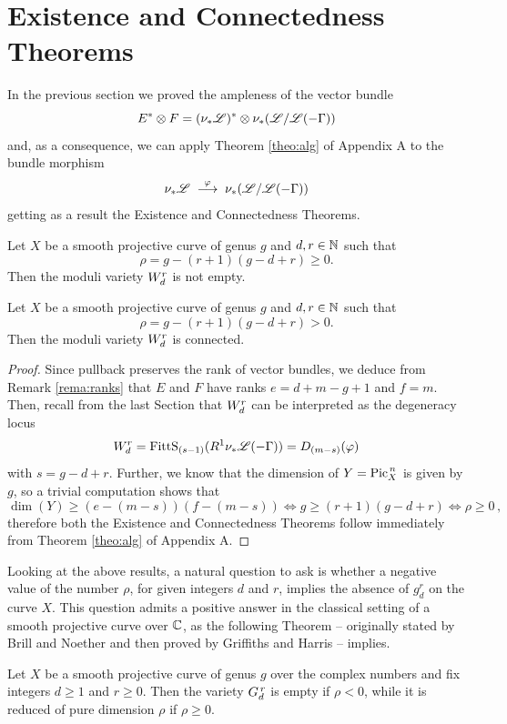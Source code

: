 \section{Existence and Connectedness Theorems}
	In the previous section we proved the ampleness of the vector bundle 
	$$ E^*\otimes F = (\nu_{*} \mathscr{L})^* \otimes \nu_{*} (\mathscr{L}/\mathscr{L}(-\Gamma)) $$
	and, as a consequence, we can apply Theorem \ref{theo:alg} of Appendix A to the bundle morphism
	$$ \nu_{*} \mathscr{L} \;\overset{\varphi}\longrightarrow\; \nu_{*} (\mathscr{L} / \mathscr{L}(-\Gamma)) $$
	getting as a result the Existence and Connectedness Theorems.
	\begin{namedtheo}\label{thm:existence}
		Let $X$ be a smooth projective curve of genus $g$ and $d,r\in \mathbb{N}$ such that
		$$ \rho = g-(r+1)(g-d+r) \geq 0. $$
		Then the moduli variety $W_d^r$ is not empty.
	\end{namedtheo}
	\begin{namedtheo}
		Let $X$ be a smooth projective curve of genus $g$ and $d,r\in \mathbb{N}$ such that
		$$ \rho = g-(r+1)(g-d+r) > 0. $$
		Then the moduli variety $W_d^r$ is connected.	
	\end{namedtheo}
	\begin{proof}
		Since pullback preserves the rank of vector bundles, we deduce from Remark \ref{rema:ranks} that $E$ and $F$ have ranks $e=d+m-g+1$ and $f=m$.
		Then, recall from the last Section that $W_d^r$ can be interpreted as the degeneracy locus
		$$ W_d^r = \operatorname{FittS}_{(s-1)}(R^1\nu_{*}\mathscr{L}(-\Gamma)) = D_{(m-s)}(\varphi) $$
		with $s=g-d+r$. Further, we know that the dimension of $Y=\operatorname{Pic}^{\,n}_X$ is given by $g$, so a trivial computation shows that
		$$ \dim(Y) \geq (e-(m-s))(f-(m-s)) \iff g \geq (r+1)(g-d+r) \iff \rho \geq 0\,, $$
		therefore both the Existence and Connectedness Theorems follow immediately from Theorem \ref{theo:alg} of Appendix A.
	\end{proof}
	Looking at the above results, a natural question to ask is whether a negative value of the \BN number $\rho$, for given integers $d$ and $r$, implies the absence of $g_d^r$ on the curve $X$. This question admits a positive answer in the classical setting of a smooth projective curve over $\mathbb{C}$, as the following Theorem -- originally stated by Brill and Noether and then proved by Griffiths and Harris -- implies.
	\begin{namedtheo}
		Let $X$ be a smooth projective curve of genus $g$ over the complex numbers and fix integers $d\geq 1$ and $r\geq 0$. Then the variety $G_d^{\,r}$ is empty if $\rho<0$, while it is reduced of pure dimension $\rho$ if $\rho\geq 0$.
	\end{namedtheo}
